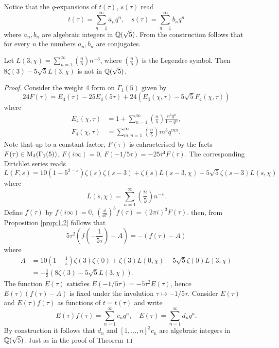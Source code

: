 Notice that the $q$-expansions of $t(\tau)$, $s(\tau)$ read
$$
    t(\tau) = \sum_{n=1}^{\infty} a_n q^n, \quad s(\tau) = \sum_{n=1}^{\infty} b_n q^n
$$
where $a_n, b_n$ are algebraic integers in $\mathbb{Q}(\sqrt{5})$.
From the construction follows that for every $n$ the numbers $a_n, b_n$ are conjugates.

\begin{theorem}
\label{thm:4}
Let $L(3, \chi) = \sum_{n=1}^{\infty} \left(\frac{n}{5}\right) n^{-3}$, where $\left(\frac{n}{5}\right)$ is the Legendre symbol.
Then $8\zeta(3) - 5\sqrt{5}L(3, \chi)$ is not in $\mathbb{Q}(\sqrt{5})$.
\end{theorem}

\begin{proof}
Consider the weight 4 form on $\Gamma_1(5)$ given by
$$
    24 F(\tau) = E_4(\tau) - 25 E_4(5\tau) + 24(E_4(\chi, \tau) - 5\sqrt{5} F_4(\chi, \tau))
$$
where
\begin{align*}
    E_4(\chi, \tau) &= 1 + \sum_{n=1}^{\infty} \left(\frac{n}{5}\right) \frac{n^3 q^n}{1 - q^n}, \\
    F_4(\chi, \tau) &= \sum_{m, n=1}^{\infty} \left(\frac{n}{5}\right) m^3  q^{mn}.
\end{align*}
Note that up to a constant factor, $F(\tau)$ is cahracterised by the facts $F(\tau) \in \mathrm{M}_4(\Gamma_1(5))$, $F(i\infty) = 0$, $F(-1/5\tau) = -25 \tau^4 F(\tau)$.
The corresponding Dirichlet series reads
$$
    L(F, s) = 10 (1 - 5^{2-s})\zeta(s) \zeta(s - 3) + \zeta(s) L(s - 3, \chi) - 5\sqrt{5} \zeta(s - 3) L(s, \chi)
$$
where
$$
    L(s, \chi) = \sum_{n=1}^{\infty} \left(\frac{n}{5}\right) n^{-s}.
$$
Define $f(\tau)$ by $f(i\infty) = 0$, $\left(\frac{\dd}{\dd \tau}\right)^{3} f(\tau) = (2\pi i)^3 F(\tau)$.
then, from Proposition \ref{prop:1.2} follows that
$$
    5 \tau^2 \left(f\left(-\frac{1}{5\tau}\right) - A\right) = - (f(\tau) - A)
$$
where
\begin{align*}
    A &= 10\left(1 - \frac{1}{5}\right) \zeta(3) \zeta(0) + \zeta(3) L(0, \chi) - 5\sqrt{5} \zeta(0) L(3, \chi) \\
    &= -\frac{1}{3} (8\zeta(3) - 5\sqrt{5} L(3, \chi)).
\end{align*}
The function $E(\tau)$ satisfies $E(-1/5\tau) = -5\tau^2 E(\tau)$, hence $E(\tau) (f(\tau) - A)$ is fixed under the involution $\tau \mapsto -1/5\tau$.
Consider $E(\tau)$ and $E(\tau)f(\tau)$ as functions of $t = t(\tau)$ and write
$$
    E(\tau)f(\tau) = \sum_{n=1}^{\infty} c_n q^n, \quad E(\tau) = \sum_{n=1}^{\infty} d_n q^n.
$$
By construction it follows that $d_n$ and $[1, \dots, n]^3 c_n$ are algebraic integers in $\mathbb{Q}(\sqrt{5})$.
Just as in the proof of Theorem
\end{proof}